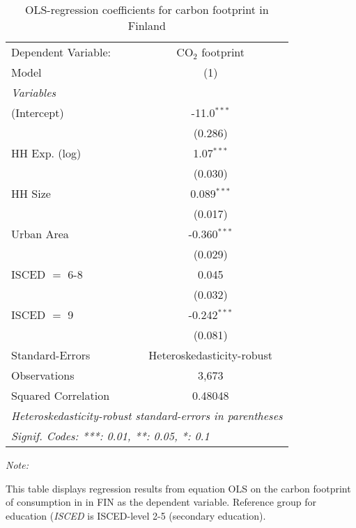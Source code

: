 
\begin{table}[htbp!]
   \centering
   \small
   \begin{adjustbox}{width = 1\textwidth, max height = 0.95\textheight, center}
      \begin{threeparttable}[b]
         \caption{\label{tab:OLS_2_FIN} OLS-regression coefficients for carbon footprint in Finland}
         \begin{tabular}{lc}
            \tabularnewline \midrule \midrule
            Dependent Variable: & CO$_{2}$ footprint\\  
            Model               & (1)\\  
            \midrule
            \emph{Variables}\\
            (Intercept)         & -11.0$^{***}$\\   
                                & (0.286)\\   
            HH Exp. (log)       & 1.07$^{***}$\\   
                                & (0.030)\\   
            HH Size             & 0.089$^{***}$\\   
                                & (0.017)\\   
            Urban Area          & -0.360$^{***}$\\   
                                & (0.029)\\   
            ISCED $=$ 6-8       & 0.045\\   
                                & (0.032)\\   
            ISCED $=$ 9         & -0.242$^{***}$\\   
                                & (0.081)\\   
            \midrule 
            Standard-Errors     & Heteroskedasticity-robust \\   
            Observations        & 3,673\\  
            Squared Correlation & 0.48048\\  
            \midrule \midrule
            \multicolumn{2}{l}{\emph{Heteroskedasticity-robust standard-errors in parentheses}}\\
            \multicolumn{2}{l}{\emph{Signif. Codes: ***: 0.01, **: 0.05, *: 0.1}}\\
         \end{tabular}
         
         \begin{tablenotes}\item \medskip \textit{Note:}
            \item This table displays regression results from equation OLS on the carbon footprint of consumption in  in FIN as the dependent variable.  Reference group for education (\textit{ISCED} is ISCED-level 2-5 (secondary education).
         \end{tablenotes}
      \end{threeparttable}
   \end{adjustbox}
\end{table}


